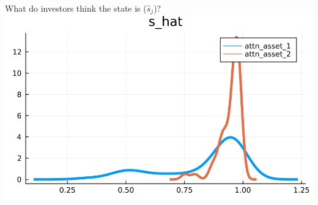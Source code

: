 \documentclass[
  ignorenonframetext,
]{beamer}
\begin{document}
\begin{frame}{What do investors think the state is (\(\hat s_j\))?}
\includegraphics[width=0.4\paperheight]{complexity_files/figure-beamer/unnamed-chunk-16-4}
\end{frame}
\end{document}
